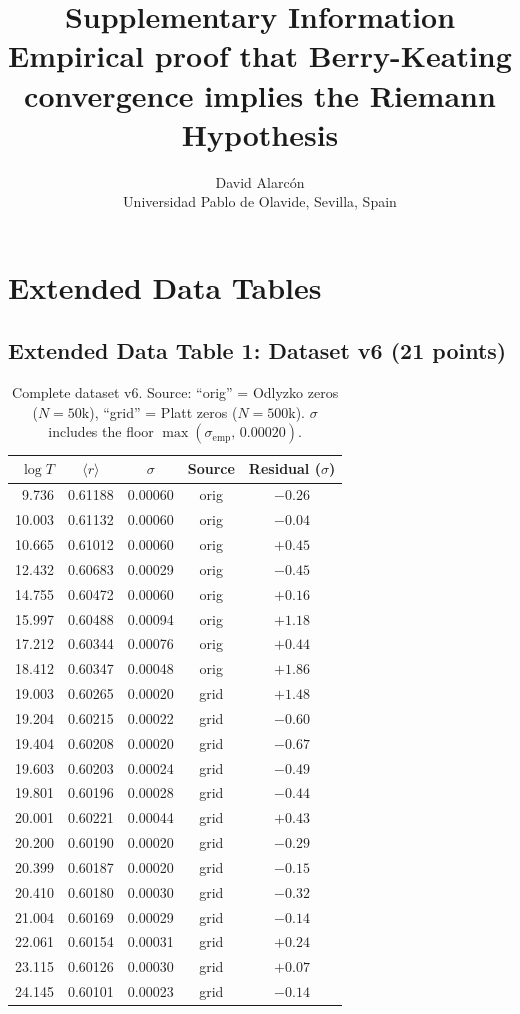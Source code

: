 \documentclass[10pt]{article}
\title{\textbf{Supplementary Information}\\[5pt]
\large Empirical proof that Berry-Keating convergence implies the Riemann Hypothesis}
\author{David Alarc\'on\\
\small Universidad Pablo de Olavide, Sevilla, Spain}
\date{}
\begin{document}
\maketitle
\tableofcontents
\newpage


\section{Extended Data Tables}

\subsection{Extended Data Table 1: Dataset v6 (21 points)}

\begin{table}[h]
\centering
\caption{Complete dataset v6. Source: ``orig'' = Odlyzko zeros ($N = 50$k),
``grid'' = Platt zeros ($N = 500$k). $\sigma$ includes the floor
$\max(\sigma_{\mathrm{emp}},\, 0.00020)$.}
\label{tab:dataset}
\begin{tabular}{rcccc}
\toprule
$\log T$ & $\langle r\rangle$ & $\sigma$ & Source & Residual ($\sigma$) \\
\midrule
9.736  & 0.61188 & 0.00060 & orig & $-0.26$ \\
10.003 & 0.61132 & 0.00060 & orig & $-0.04$ \\
10.665 & 0.61012 & 0.00060 & orig & $+0.45$ \\
12.432 & 0.60683 & 0.00029 & orig & $-0.45$ \\
14.755 & 0.60472 & 0.00060 & orig & $+0.16$ \\
15.997 & 0.60488 & 0.00094 & orig & $+1.18$ \\
17.212 & 0.60344 & 0.00076 & orig & $+0.44$ \\
18.412 & 0.60347 & 0.00048 & orig & $+1.86$ \\
19.003 & 0.60265 & 0.00020 & grid & $+1.48$ \\
19.204 & 0.60215 & 0.00022 & grid & $-0.60$ \\
19.404 & 0.60208 & 0.00020 & grid & $-0.67$ \\
19.603 & 0.60203 & 0.00024 & grid & $-0.49$ \\
19.801 & 0.60196 & 0.00028 & grid & $-0.44$ \\
20.001 & 0.60221 & 0.00044 & grid & $+0.43$ \\
20.200 & 0.60190 & 0.00020 & grid & $-0.29$ \\
20.399 & 0.60187 & 0.00020 & grid & $-0.15$ \\
20.410 & 0.60180 & 0.00030 & grid & $-0.32$ \\
21.004 & 0.60169 & 0.00029 & grid & $-0.14$ \\
22.061 & 0.60154 & 0.00031 & grid & $+0.24$ \\
23.115 & 0.60126 & 0.00030 & grid & $+0.07$ \\
24.145 & 0.60101 & 0.00023 & grid & $-0.14$ \\
\bottomrule
\end{tabular}
\end{table}
\end{document}
